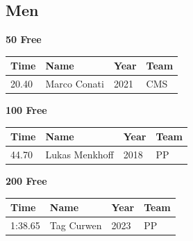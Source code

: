 \subsection{Men}
\vspace{1.2em}
\noindent\begin{minipage}[t]{0.98\textwidth}
\centering
\textbf{\textcolor{teamprimary}{50 Free}}\par
\vspace{0.5em}
\centering
\small
\renewcommand{\arraystretch}{1.0}
\setlength{\tabcolsep}{4pt}
\begin{tabular}{@{}p{2.5cm}p{4.5cm}p{1.5cm}p{2.5cm}@{}}
\toprule
\textbf{Time} & \textbf{Name} & \textbf{Year} & \textbf{Team} \\
\midrule
20.40 & Marco Conati & 2021 & CMS \\
\bottomrule
\end{tabular}
\end{minipage}
\vspace{1.2em}
\noindent\begin{minipage}[t]{0.98\textwidth}
\centering
\textbf{\textcolor{teamprimary}{100 Free}}\par
\vspace{0.5em}
\centering
\small
\renewcommand{\arraystretch}{1.0}
\setlength{\tabcolsep}{4pt}
\begin{tabular}{@{}p{2.5cm}p{4.5cm}p{1.5cm}p{2.5cm}@{}}
\toprule
\textbf{Time} & \textbf{Name} & \textbf{Year} & \textbf{Team} \\
\midrule
44.70 & Lukas Menkhoff & 2018 & PP \\
\bottomrule
\end{tabular}
\end{minipage}
\vspace{1.2em}
\noindent\begin{minipage}[t]{0.98\textwidth}
\centering
\textbf{\textcolor{teamprimary}{200 Free}}\par
\vspace{0.5em}
\centering
\small
\renewcommand{\arraystretch}{1.0}
\setlength{\tabcolsep}{4pt}
\begin{tabular}{@{}p{2.5cm}p{4.5cm}p{1.5cm}p{2.5cm}@{}}
\toprule
\textbf{Time} & \textbf{Name} & \textbf{Year} & \textbf{Team} \\
\midrule
1:38.65 & Tag Curwen & 2023 & PP \\
\bottomrule
\end{tabular}
\end{minipage}
\vspace{1.2em}
